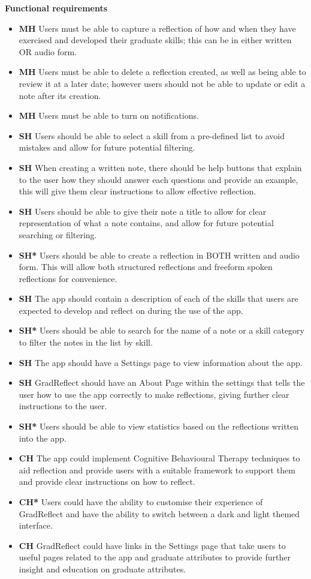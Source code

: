 \documentclass{l4proj}
\begin{document}
\textbf{Functional requirements}
\begin{itemize}
    \item \textbf{MH} Users must be able to capture a reflection of how and when they have exercised and developed their graduate skills; this can be in either written OR audio form.
    \item \textbf{MH} Users must be able to delete a reflection created, as well as being able to review it at a later date; however users should not be able to update or edit a note after its creation. 
    \item \textbf{MH} Users must be able to turn on notifications.

    \item \textbf{SH} Users should be able to select a skill from a pre-defined list to avoid mistakes and allow for future potential filtering.
    \item \textbf{SH} When creating a written note, there should be help buttons that explain to the user how they should answer each questions and provide an example, this will give them clear instructions to allow effective reflection.
    \item \textbf{SH} Users should be able to give their note a title to allow for clear representation of what a note contains, and allow for future potential searching or filtering.
    \item \textbf{SH*} Users should be able to create a reflection in BOTH written and audio form. This will allow both structured reflections and freeform spoken reflections for convenience. 
    \item \textbf{SH} The app should contain a description of each of the skills that users are expected to develop and reflect on during the use of the app. 
    \item \textbf{SH*} Users should be able to search for the name of a note or a skill category to filter the notes in the list by skill.
    \item \textbf{SH} The app should have a Settings page to view information about the app.
    \item \textbf{SH} GradReflect should have an About Page within the settings that tells the user how to use the app correctly to make reflections, giving further clear instructions to the user. 
    \item \textbf{SH*} Users should be able to view statistics based on the reflections written into the app.
    
    \item \textbf{CH} The app could implement Cognitive Behavioural Therapy techniques to aid reflection and provide users with a suitable framework to support them and provide clear instructions on how to reflect. 
    \item \textbf{CH*} Users could have the ability to customise their experience of GradReflect and have the ability to switch between a dark and light themed interface.
    \item \textbf{CH} GradReflect could have links in the Settings page that take users to useful pages related to the app and graduate attributes to provide further insight and education on graduate attributes.
    

\end{itemize}
\end{document}
